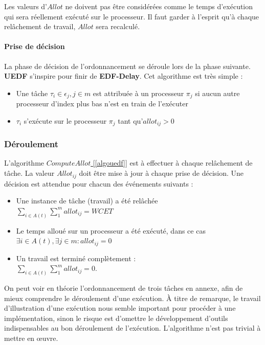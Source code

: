 	Les valeurs d'$Allot$ ne doivent pas être considérées comme le temps d'exécution qui sera réellement 
	exécuté sur le processeur. Il faut garder à l'esprit qu'à chaque relâchement de travail, 
	$Allot$ sera recalculé. 

	\paragraph{Prise de décision}
	La phase de décision de l'ordonnancement se déroule lors de la phase suivante.
	\textbf{UEDF} s'inspire pour finir de \textbf{EDF-Delay}. 
	Cet algorithme est très simple :
	\begin{itemize}
		\setlength\itemsep{0.1em}
		\item Une tâche $\tau_i \in \epsilon_j, j \in m$ est attribuée à un processeur $\pi_j$ si aucun autre processeur d'index plus bas n'est en train de l'exécuter
		\item $\tau_i$ s'exécute sur le processeur $\pi_j$ tant qu'$allot_{ij} > 0$
	\end{itemize}


	\subsubsection{Déroulement}	
	L'algorithme \hyperref[algouedf]{$Compute Allot$ [\ref*{algouedf}]} est à effectuer à chaque relâchement de tâche. La valeur $Allot_{ij}$ 
	doit être mise à jour à chaque prise de décision. Une décision est attendue pour chacun des événements suivants :
	\begin{itemize}
		\setlength\itemsep{0.1em}
		\item Une instance de tâche (travail) a été relâchée\\
		 $\sum_{i \in A(t)}\sum_{1}^{m}allot_{ij} = WCET$
		\item Le temps alloué sur un processeur a été exécuté, dans ce cas\\ $\exists i \in A(t), \exists j \in m : allot_{ij} = 0$
		\item Un travail est terminé complètement : \\
		$\sum_{i \in A(t)}\sum_{1}^{m}allot_{ij} = 0$.
	\end{itemize}
	
	On peut voir en théorie l'ordonnancement de trois tâches en annexe, afin de mieux comprendre le déroulement d'une exécution.
	À titre de remarque, le travail d'illustration d'une exécution nous semble 
	important pour procéder à une implémentation, sinon le risque est d'omettre le développement 
	d'outils indispensables au bon déroulement de l'exécution. L'algorithme n'est pas trivial à mettre en œuvre.
	\newline
	
